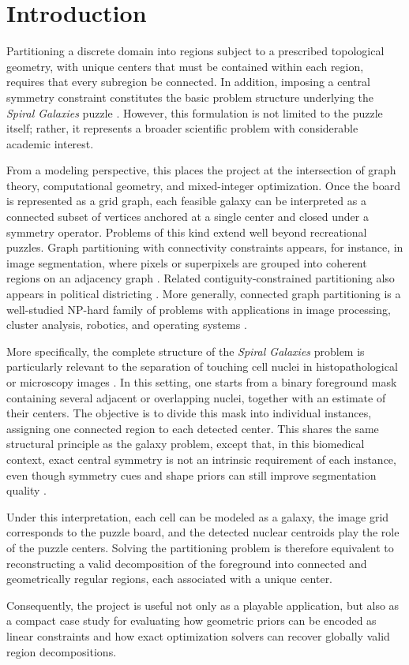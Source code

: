 \section{Introduction}

Partitioning a discrete domain into regions subject to a prescribed topological geometry, with unique centers that must be contained within each region, requires that every subregion be connected. In addition, imposing a central symmetry constraint constitutes the basic problem structure underlying the \textit{Spiral Galaxies} puzzle \cite{fertin2015}. However, this formulation is not limited to the puzzle itself; rather, it represents a broader scientific problem with considerable academic interest.

From a modeling perspective, this places the project at the intersection of graph theory, computational geometry, and mixed-integer optimization. Once the board is represented as a grid graph, each feasible galaxy can be interpreted as a connected subset of vertices anchored at a single center and closed under a symmetry operator. Problems of this kind extend well beyond recreational puzzles. Graph partitioning with connectivity constraints appears, for instance, in image segmentation, where pixels or superpixels are grouped into coherent regions on an adjacency graph \cite{shi2000}. Related contiguity-constrained partitioning also appears in political districting \cite{validi2022}. More generally, connected graph partitioning is a well-studied NP-hard family of problems with applications in image processing, cluster analysis, robotics, and operating systems \cite{miyazawa2021}.

More specifically, the complete structure of the \textit{Spiral Galaxies} problem is particularly relevant to the separation of touching cell nuclei in histopathological or microscopy images \cite{dey2024}. In this setting, one starts from a binary foreground mask containing several adjacent or overlapping nuclei, together with an estimate of their centers. The objective is to divide this mask into individual instances, assigning one connected region to each detected center. This shares the same structural principle as the galaxy problem, except that, in this biomedical context, exact central symmetry is not an intrinsic requirement of each instance, even though symmetry cues and shape priors can still improve segmentation quality \cite{sun2012,gorelick2017}.

Under this interpretation, each cell can be modeled as a galaxy, the image grid corresponds to the puzzle board, and the detected nuclear centroids play the role of the puzzle centers. Solving the partitioning problem is therefore equivalent to reconstructing a valid decomposition of the foreground into connected and geometrically regular regions, each associated with a unique center.

Consequently, the project is useful not only as a playable application, but also as a compact case study for evaluating how geometric priors can be encoded as linear constraints and how exact optimization solvers can recover globally valid region decompositions.
